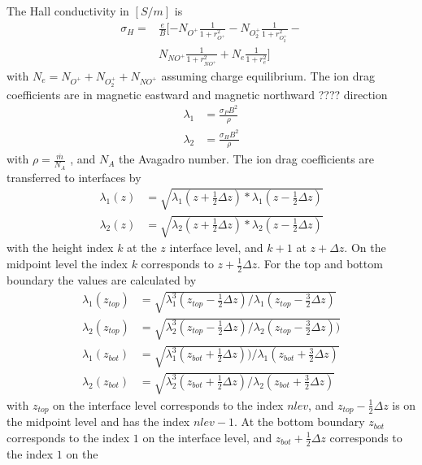 %
The Hall conductivity in $[S/m]$ is
%
\begin{equation}
  \begin{split}
   \sigma_H = &\frac{e}{B} [ -N_{O^+} \frac{1}
      {1+r_{O^+}^2 } -
       N_{O_2^+} \frac{1}
      {1+r_{O_2^+}^2 } - \\
      & N_{NO^+} \frac{1}
      {1+r_{NO^+}^2 }+
       N_{e} \frac{1}
      {1+r_{e}^2 }  ]
  \end{split}
\end{equation}
%
with $N_e = N_{O^+} + N_{O_2^+} + N_{NO^+}$ assuming charge
equilibrium. The ion drag coefficients are in magnetic eastward and
magnetic northward ???? direction
%
\begin{align}
  \lambda_1 &= \frac{\sigma_P B^2}{\rho} \\
  \lambda_2 &= \frac{\sigma_H B^2}{\rho}
\end{align}
%
with $\rho= \frac{\overline{m}}{N_A}$ , and $N_A$ the Avagadro
number. The ion drag coefficients are transferred to interfaces by
%
\begin{align}
  \lambda_1(z) &= \sqrt{\lambda_1(z+\frac{1}{2} \Delta z)*\lambda_1(z-\frac{1}{2} \Delta z)} \\
  \lambda_2(z) &= \sqrt{\lambda_2(z+\frac{1}{2} \Delta z)*\lambda_2(z-\frac{1}{2} \Delta z)}
\end{align}
%
with the height index $k$ at the $z$ interface level, and $k+1$ at
$z + \Delta z$. On the midpoint level the index $k$ corresponds to
$z+\frac{1}{2} \Delta z$. For the top and bottom boundary the values
are calculated by
%
\begin{align}
  \lambda_1(z_{top}) &= \sqrt{\lambda_1^3(z_{top}-\frac{1}{2}\Delta z)/ \lambda_1(z_{top}-\frac{3}{2}\Delta z)} \\
  \lambda_2(z_{top}) &= \sqrt{\lambda_2^3(z_{top}-\frac{1}{2}\Delta z)/ \lambda_2(z_{top}-\frac{3}{2}\Delta z))} \\
  \lambda_1(z_{bot}) &= \sqrt{\lambda_1^3(z_{bot}+\frac{1}{2}\Delta z))/ \lambda_1(z_{bot}+\frac{3}{2}\Delta z)} \\
  \lambda_2(z_{bot}) &= \sqrt{\lambda_2^3(z_{bot}+\frac{1}{2}\Delta z)/ \lambda_2(z_{bot}+\frac{3}{2}\Delta z)}
\end{align}
%
with $z_{top}$ on the interface level corresponds to the index
$nlev$, and $z_{top}-\frac{1}{2}\Delta z$ is on the midpoint level
and has the index $nlev -1$. At the bottom boundary $z_{bot}$
corresponds to the index $1$ on the interface level, and
$z_{bot}+\frac{1}{2}\Delta z$ corresponds to the index $1$ on the

